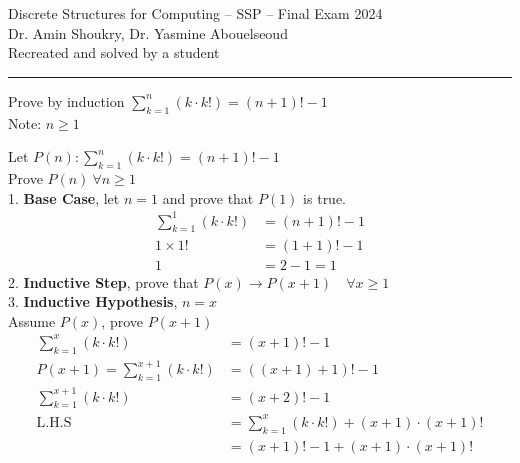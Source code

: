 \documentclass[answers]{exam}
\newcommand{\normalfontsize}{\fontsize{14pt}{16pt}\selectfont}
\newcommand{\titlefontsize}{\fontsize{16pt}{20pt}\selectfont}
\begin{document}
\noindent
\titlefontsize Discrete Structures for Computing -- SSP -- Final Exam 2024\\
\normalfontsize Dr. Amin Shoukry, Dr. Yasmine Abouelseoud\\Recreated and solved by a student
\hrule
\begin{questions}
    \question Prove by induction $\sum \limits_{k = 1}^{n} (k \cdot k!) = (n + 1)! - 1$\\ Note: $n \ge 1$
    \begin{shaded}
        \begin{solutionorbox}
            Let $P(n): \sum \limits_{k = 1}^{n} (k \cdot k!) = (n + 1)! - 1$\\[+.7em]
            Prove $P(n) ~ \forall n \ge 1 $\\
            1. \textbf{Base Case}, let $n = 1$ and prove that $P(1)$ is true.
            \begin{align*}
                \sum \limits_{k = 1}^{1} (k \cdot k!) & = (n + 1)! - 1 \tag{Base Case} \\
                1 \times 1!                           & = (1+1)! - 1 \tag{Substitute}  \\
                1                                     & = 2 - 1 = 1 \tag{Proven}
            \end{align*}
            2. \textbf{Inductive Step}, prove that $P(x) \rightarrow P(x+1) \quad \forall x \ge 1$\\
            3. \textbf{Inductive Hypothesis}, $n = x$\\
            Assume $P(x)$, prove $P(x+1)$
            \begin{align*}
                \sum \limits_{k = 1}^{x} (k \cdot k!)            & = (x + 1)! - 1 \tag{Assume $P(x)$}                                               \\
                P(x+1) = \sum \limits_{k = 1}^{x+1} (k \cdot k!) & = ((x + 1) + 1)! -1 \tag{R.T.P $P(x+1)$}                                         \\
                \sum \limits_{k = 1}^{x+1} (k \cdot k!)          & = (x + 2)! -1 \tag{Simplify}                                                     \\
                \text{L.H.S}                                     & = \sum \limits_{k = 1}^{x} (k \cdot k!) + (x+1) \cdot (x+1)! \tag{Expand Series} \\
                                                                 & = (x + 1)! - 1 + (x+1) \cdot (x+1)! \tag{Sub. from $P(x)$}                       \\

\end{align*}
\end{solutionorbox}
\end{shaded}
\end{questions}
\end{document}
